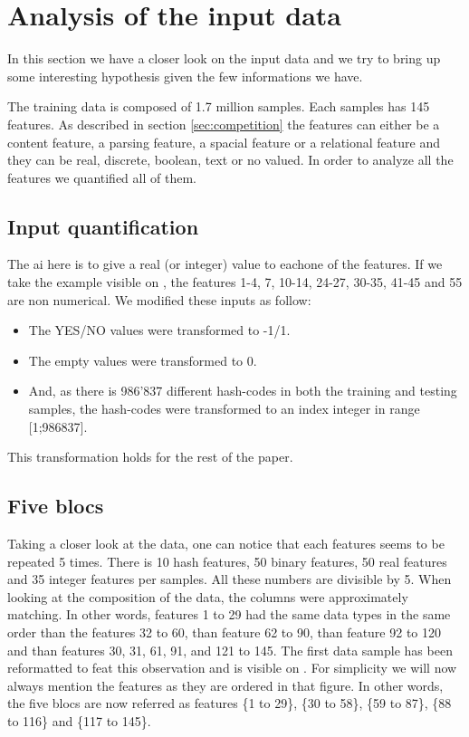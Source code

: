 \section{Analysis of the input data}
\label{sec:personal_analyze}
	In this section we have a closer look on the input data and we try to bring up some interesting hypothesis given the few informations we have.

	The training data is composed of 1.7 million samples. Each samples has 145 features. As described in section \ref{sec:competition} the features can either be a content feature, a parsing feature, a spacial feature or a relational feature and they can be real, discrete, boolean, text or no valued. In order to analyze all the features we quantified all of them.

	\subsection{Input quantification}
		The ai here is to give a real (or integer) value to eachone of the features. If we take the example visible on , the features 1-4, 7, 10-14, 24-27, 30-35, 41-45 and 55 are non numerical. We modified these inputs as follow:
		\begin{itemize}
			\item The YES/NO values were transformed to -1/1.
			\item The empty values were transformed to 0.
			\item And, as there is 986'837 different hash-codes in both the training and testing samples, the hash-codes were transformed to an index integer in range [1;986837].
		\end{itemize}
		This transformation holds for the rest of the paper.

	\subsection{Five blocs}

		Taking a closer look at the data, one can notice that each features seems to be repeated 5 times. There is 10 hash features, 50 binary features, 50 real features and 35 integer features per samples. All these numbers are divisible by 5. When looking at the composition of the data, the columns were approximately matching. In other words, features 1 to 29 had the same data types in the same order than the features 32 to 60, than feature 62 to 90, than feature 92 to 120 and than features 30, 31, 61, 91, and 121 to 145. The first data sample has been reformatted to feat this observation and is visible on . For simplicity we will now always mention the features as they are ordered in that figure. In other words, the five blocs are now referred as features \{1 to 29\}, \{30 to 58\}, \{59 to 87\}, \{88 to 116\} and \{117 to 145\}.

